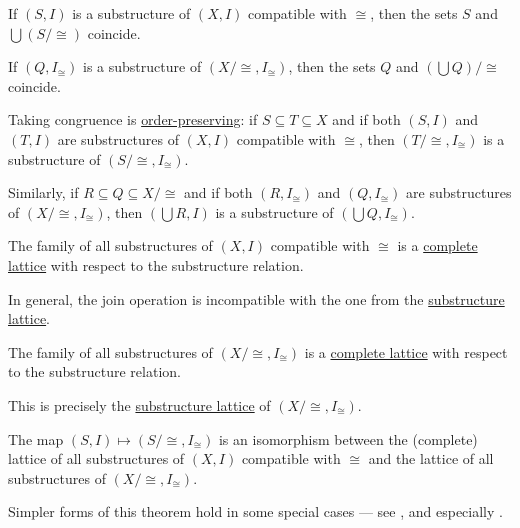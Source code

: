 \begin{theorem}
\begin{thmenum}
     If \( (S, I) \) is a substructure of \( (X, I) \) compatible with \( {\cong} \), then the sets \( S \) and \( \bigcup (S / {\cong}) \) coincide.

     If \( (Q, I_\cong) \) is a substructure of \( (X / {\cong}, I_\cong) \), then the sets \( Q \) and \( (\bigcup Q) / {\cong} \) coincide.

     Taking congruence is \hyperref[def:order_function/preserving]{order-preserving}: if \( S \subseteq T \subseteq X \) and if both \( (S, I) \) and \( (T, I) \) are substructures of \( (X, I) \) compatible with \( {\cong} \), then \( (T / {\cong}, I_\cong) \) is a substructure of \( (S / {\cong}, I_\cong) \).

     Similarly, if \( R \subseteq Q \subseteq X / {\cong} \) and if both \( (R, I_\cong) \) and \( (Q, I_\cong) \) are substructures of \( (X / {\cong}, I_\cong) \), then \( (\bigcup R, I) \) is a substructure of \( (\bigcup Q, I_\cong) \).

     The family of all substructures of \( (X, I) \) compatible with \( {\cong} \) is a \hyperref[def:lattice]{complete lattice} with respect to the substructure relation.

    In general, the join operation is incompatible with the one from the \hyperref[thm:substructures_form_complete_lattice]{substructure lattice}.

     The family of all substructures of \( (X / {\cong}, I_\cong) \) is a \hyperref[def:lattice]{complete lattice} with respect to the substructure relation.

    This is precisely the \hyperref[thm:substructures_form_complete_lattice]{substructure lattice} of \( (X / {\cong}, I_\cong) \).

     The map \( (S, I) \mapsto (S / {\cong}, I_\cong) \) is an isomorphism between the (complete) lattice of all substructures of \( (X, I) \) compatible with \( {\cong} \) and the lattice of all substructures of \( (X / {\cong}, I_\cong) \).
  \end{thmenum}
\end{theorem}
\begin{comments}
  \item Simpler forms of this theorem hold in some special cases --- see ,  and especially .
\end{comments}

